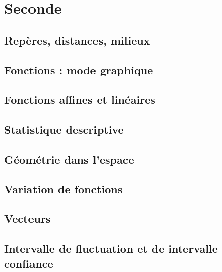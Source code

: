 \documentclass[a4paper,12pt]{book}
\begin{document}
\part{Seconde}


\chapter{Repères, distances, milieux}


\chapter{Fonctions : mode graphique}


\chapter{Fonctions affines et linéaires}


\chapter{Statistique descriptive}


\chapter{Géométrie dans l'espace}


\chapter{Variation de fonctions}

\chapter{Vecteurs}


\chapter{Intervalle de fluctuation et de intervalle confiance}

\end{document}
